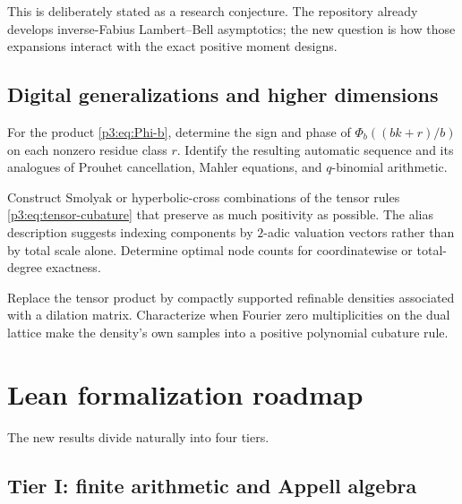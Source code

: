 \documentclass[11pt,oneside]{article}
\numberwithin{equation}{section}
\theoremstyle{definition}
\theoremstyle{remark}
\begin{document}
This is deliberately stated as a research conjecture.  The repository already develops inverse-Fabius Lambert--Bell asymptotics; the new question is how those expansions interact with the exact positive moment designs.

\subsection{Digital generalizations and higher dimensions}

\begin{problem}
\label{p3:prob:base-b-signs}
For the product \eqref{p3:eq:Phi-b}, determine the sign and phase of $\Phi_b((bk+r)/b)$ on each nonzero residue class $r$.  Identify the resulting automatic sequence and its analogues of Prouhet cancellation, Mahler equations, and $q$-binomial arithmetic.
\end{problem}

\begin{problem}
\label{p3:prob:sparse-grid}
Construct Smolyak or hyperbolic-cross combinations of the tensor rules \eqref{p3:eq:tensor-cubature} that preserve as much positivity as possible.  The alias description suggests indexing components by $2$-adic valuation vectors rather than by total scale alone.  Determine optimal node counts for coordinatewise or total-degree exactness.
\end{problem}

\begin{problem}
\label{p3:prob:nonproduct-laws}
Replace the tensor product by compactly supported refinable densities associated with a dilation matrix.  Characterize when Fourier zero multiplicities on the dual lattice make the density's own samples into a positive polynomial cubature rule.
\end{problem}

\section{Lean formalization roadmap}
\label{p3:sec:lean}

The new results divide naturally into four tiers.

\subsection{Tier I: finite arithmetic and Appell algebra}
\end{document}
